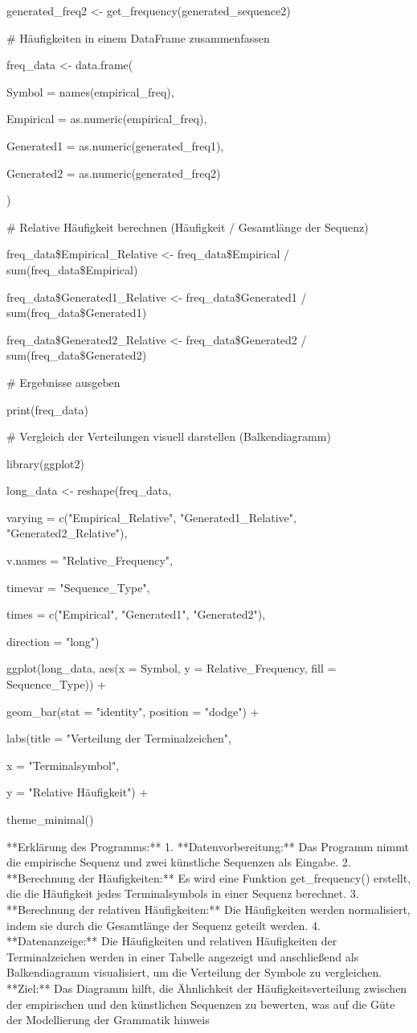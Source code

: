 \documentclass[
]{article}
\begin{document}
generated\_freq2 \textless- get\_frequency(generated\_sequence2)

\# Häufigkeiten in einem DataFrame zusammenfassen

freq\_data \textless- data.frame(

Symbol = names(empirical\_freq),

Empirical = as.numeric(empirical\_freq),

Generated1 = as.numeric(generated\_freq1),

Generated2 = as.numeric(generated\_freq2)

)

\# Relative Häufigkeit berechnen (Häufigkeit / Gesamtlänge der Sequenz)

freq\_data\$Empirical\_Relative \textless- freq\_data\$Empirical /
sum(freq\_data\$Empirical)

freq\_data\$Generated1\_Relative \textless- freq\_data\$Generated1 /
sum(freq\_data\$Generated1)

freq\_data\$Generated2\_Relative \textless- freq\_data\$Generated2 /
sum(freq\_data\$Generated2)

\# Ergebnisse ausgeben

print(freq\_data)

\# Vergleich der Verteilungen visuell darstellen (Balkendiagramm)

library(ggplot2)

long\_data \textless- reshape(freq\_data,

varying = c("Empirical\_Relative", "Generated1\_Relative",
"Generated2\_Relative"),

v.names = "Relative\_Frequency",

timevar = "Sequence\_Type",

times = c("Empirical", "Generated1", "Generated2"),

direction = "long")

ggplot(long\_data, aes(x = Symbol, y = Relative\_Frequency, fill =
Sequence\_Type)) +

geom\_bar(stat = "identity", position = "dodge") +

labs(title = "Verteilung der Terminalzeichen",

x = "Terminalsymbol",

y = "Relative Häufigkeit") +

theme\_minimal()

**Erklärung des Programms:** 1. **Datenvorbereitung:** Das Programm
nimmt die empirische Sequenz und zwei künstliche Sequenzen als Eingabe.
2. **Berechnung der Häufigkeiten:** Es wird eine Funktion
get\_frequency() erstellt, die die Häufigkeit jedes Terminalsymbols in
einer Sequenz berechnet. 3. **Berechnung der relativen Häufigkeiten:**
Die Häufigkeiten werden normalisiert, indem sie durch die Gesamtlänge
der Sequenz geteilt werden. 4. **Datenanzeige:** Die Häufigkeiten und
relativen Häufigkeiten der Terminalzeichen werden in einer Tabelle
angezeigt und anschließend als Balkendiagramm visualisiert, um die
Verteilung der Symbole zu vergleichen. **Ziel:** Das Diagramm hilft, die
Ähnlichkeit der Häufigkeitsverteilung zwischen der empirischen und den
künstlichen Sequenzen zu bewerten, was auf die Güte der Modellierung der
Grammatik hinweis
\end{document}
